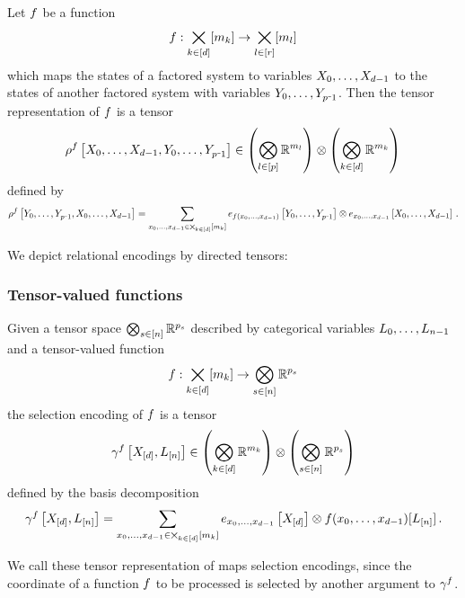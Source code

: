 \begin{definition}\label{def:functionRepresentation}
	Let $f$ be a function
		\[ f : \bigtimes_{k\in[d]}[m_{k}] \rightarrow  \bigtimes_{l\in[r]}[m_{l}] \]
	which maps the states of a factored system to variables $X_{0},\ldots,X_{d-1}$ to the states of another factored system with variables $\seccatvariables$.
	Then the tensor representation of $f$ is a tensor
		\[ \rencodingofat{\exformula}{\catvariables,\seccatvariables} \in  \left(\secfacspace\right) \otimes \left(\facspace\right)  \]
	defined by
		\[ \rencodingofat{\exformula}{\seccatvariables,\catvariables}= \sum_{\catindices\in\facstates}  
		\onehotmapofat{\exfunction(\catindices)}{\seccatvariables} \otimes  \onehotmapofat{\catindices}{\catvariables} \, . \]
\end{definition}

We depict relational encodings by directed tensors:
\begin{center}
	
\end{center}






\subsubsection{Tensor-valued functions}


\begin{definition}\label{def:selectionEncoding}
	Given a tensor space $\bigotimes_{s\in[n]}\mathbb{R}^{p_{s}}$ described by categorical variables $L_{0},\ldots,L_{n-1}$ and a tensor-valued function
		\[ f : \bigtimes_{k\in[d]}[m_{k}] \rightarrow \bigotimes_{s\in[n]}\mathbb{R}^{p_{s}} \]
	the selection encoding of $f$ is a tensor
		\[ \gamma^{f}\left[X_{[d]},L_{[n]}\right] \in \left(\bigotimes_{k\in[d]} \mathbb{R}^{m_{k}}\right) \otimes \left(\bigotimes_{s\in[n]}\mathbb{R}^{p_{s}}\right) \]
	defined by the basis decomposition
		\[ \gamma^{f}\left[X_{[d]},L_{[n]}\right] = \sum_{x_{0},\ldots,x_{d-1}\in\bigtimes_{k\in[d]}[m_{k}]} e_{x_{0},\ldots,x_{d-1}}\left[X_{[d]}\right] \otimes f(x_{0},\ldots,x_{d-1})[L_{[n]}] \, .  \]
\end{definition}

We call these tensor representation of maps selection encodings, since the coordinate of a function $f$ to be processed is selected by another argument to $\gamma^{f}$.

